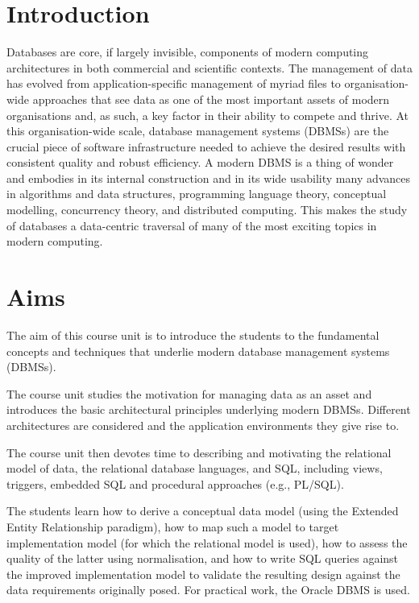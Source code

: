 \section*{Introduction}

Databases are core, if largely invisible, components of modern computing
architectures in both commercial and scientific contexts. The management of data
has evolved from application-specific management of myriad files to
organisation-wide approaches that see data as one of the most important assets
of modern organisations and, as such, a key factor in their ability to compete
and thrive. At this organisation-wide scale, database management systems (DBMSs)
are the crucial piece of software infrastructure needed to achieve the desired
results with consistent quality and robust efficiency. A modern DBMS is a thing
of wonder and embodies in its internal construction and in its wide usability
many advances in algorithms and data structures, programming language theory,
conceptual modelling, concurrency theory, and distributed computing. This makes
the study of databases a data-centric traversal of many of the most exciting
topics in modern computing.

\section*{Aims}

The aim of this course unit is to introduce the students to the fundamental
concepts and techniques that underlie modern database management systems
(DBMSs).

The course unit studies the motivation for managing data as an asset and
introduces the basic architectural principles underlying modern DBMSs. Different
architectures are considered and the application environments they give rise to.

The course unit then devotes time to describing and motivating the relational
model of data, the relational database languages, and SQL, including views,
triggers, embedded SQL and procedural approaches (e.g., PL/SQL).

The students learn how to derive a conceptual data model (using the Extended
Entity Relationship paradigm), how to map such a model to target implementation
model (for which the relational model is used), how to assess the quality of the
latter using normalisation, and how to write SQL queries against the improved
implementation model to validate the resulting design against the data
requirements originally posed. For practical work, the Oracle DBMS is used.

